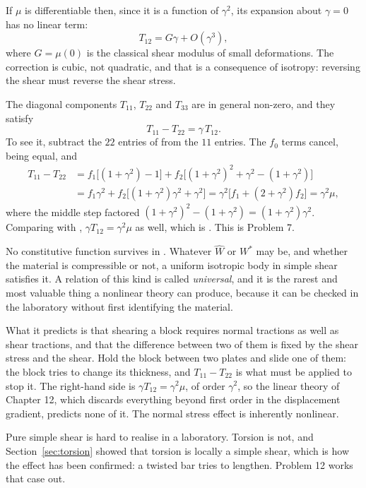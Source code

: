 If $\mu$ is differentiable then, since it is a function of $\gamma^{2}$,
its expansion about $\gamma=0$ has no linear term:
\begin{equation}
   T_{12}=G\gamma+O(\gamma^{3}),
   \tag{11.41}\label{eq:11.41}
\end{equation}
where $G=\mu(0)$ is the classical shear modulus of small deformations.
The correction is cubic, not quadratic, and that is a consequence of
isotropy: reversing the shear must reverse the shear stress.

The diagonal components $T_{11}$, $T_{22}$ and $T_{33}$ are in general
non-zero, and they satisfy
\begin{equation}
   T_{11}-T_{22}=\gamma\,T_{12} .
   \tag{11.42}\label{eq:11.42}
\end{equation}
To see it, subtract the $22$ entries of  from the $11$
entries. The $f_{0}$ terms cancel, being equal, and
\[
\begin{aligned}
   T_{11}-T_{22}&=f_{1}\big[(1+\gamma^{2})-1\big]
   +f_{2}\big[(1+\gamma^{2})^{2}+\gamma^{2}-(1+\gamma^{2})\big]\\
   &=f_{1}\gamma^{2}
   +f_{2}\big[(1+\gamma^{2})\gamma^{2}+\gamma^{2}\big]
   =\gamma^{2}\big[f_{1}+(2+\gamma^{2})f_{2}\big]
   =\gamma^{2}\mu ,
\end{aligned}
\]
where the middle step factored $(1+\gamma^{2})^{2}-(1+\gamma^{2})
=(1+\gamma^{2})\gamma^{2}$. Comparing with ,
$\gamma T_{12}=\gamma^{2}\mu$ as well, which is . This is
Problem 7.

\begin{remark}%
\label{rem:ch11universal}
No constitutive function survives in . Whatever $\hat W$ or
$W^{*}$ may be, and whether the material is compressible or not, a
uniform isotropic body in simple shear satisfies it. A relation of this
kind is called \emph{universal}, and it is the rarest and most valuable
thing a nonlinear theory can produce, because it can be checked in the
laboratory without first identifying the material.

What it predicts is that shearing a block requires normal tractions as
well as shear tractions, and that the difference between two of them is
fixed by the shear stress and the shear. Hold the block between two
plates and slide one of them: the block tries to change its thickness,
and $T_{11}-T_{22}$ is what must be applied to stop it. The right-hand
side is $\gamma T_{12}=\gamma^{2}\mu$, of order $\gamma^{2}$, so the
linear theory of Chapter 12, which discards everything beyond first
order in the displacement gradient, predicts none of it. The normal
stress effect is inherently nonlinear.

Pure simple shear is hard to realise in a laboratory. Torsion is not,
and Section~\ref{sec:torsion} showed that torsion is locally a simple
shear, which is how the effect has been confirmed: a twisted bar tries
to lengthen. Problem 12 works that case out.
\end{remark}

